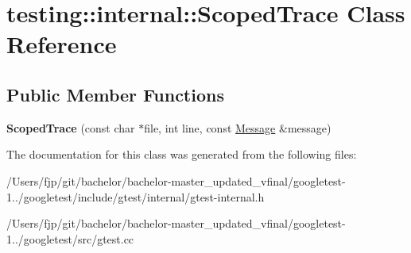 \hypertarget{classtesting_1_1internal_1_1_scoped_trace}{}\section{testing\+:\+:internal\+:\+:Scoped\+Trace Class Reference}
\label{classtesting_1_1internal_1_1_scoped_trace}
\subsection*{Public Member Functions}
\begin{DoxyCompactItemize}
\item 
\mbox{\label{classtesting_1_1internal_1_1_scoped_trace_ab965d7010bbbc82c1bef6ebf8748bede}} 
{\bfseries Scoped\+Trace} (const char $\ast$file, int line, const \mbox{\hyperlink{classtesting_1_1_message}{Message}} \&message)
\end{DoxyCompactItemize}


The documentation for this class was generated from the following files\+:\begin{DoxyCompactItemize}
\item 
/\+Users/fjp/git/bachelor/bachelor-\/master\+\_\+updated\+\_\+vfinal/googletest-\/1../googletest/include/gtest/internal/gtest-\/internal.\+h\item 
/\+Users/fjp/git/bachelor/bachelor-\/master\+\_\+updated\+\_\+vfinal/googletest-\/1../googletest/src/gtest.\+cc\end{DoxyCompactItemize}
